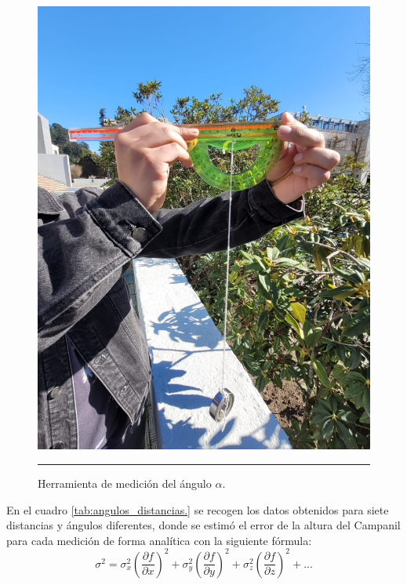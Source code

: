 \documentclass[10pt,a4paper]{article}
\begin{document}
\begin{multicols}{2}
		\begin{figure}[H]
			\centering
			\includegraphics[scale=0.1]{IMG/transportador.jpeg} 
			\caption{Herramienta de medición del ángulo $\alpha$.}
			\label{Transportadot}
			\rule{80mm}{0.1mm}
		\end{figure}
		
	En el cuadro \ref{tab:angulos_distancias.} se recogen los datos obtenidos para siete distancias y ángulos diferentes, donde se estimó el error de la altura del Campanil para cada medición de forma analítica con la siguiente fórmula:
		\begin{equation}
\sigma^{2} = \sigma_x^2 \left( \frac{\partial f}{\partial x} \right)^2 + \sigma_y^2 \left( \frac{\partial f}{\partial y} \right)^2 + \sigma_z^2 \left( \frac{\partial f}{\partial z} \right)^2 + ...
		\end{equation}
	\end{multicols}
	
\end{document}
